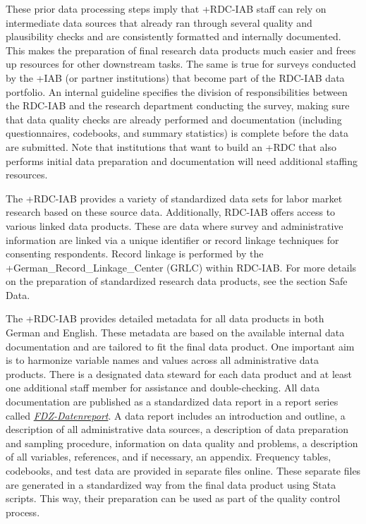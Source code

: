 \documentclass[
]{book}
\begin{document}
These prior data processing steps imply that +RDC-IAB\textbar{} staff can rely on intermediate data sources that already ran through several quality and plausibility checks and are consistently formatted and internally documented. This makes the preparation of final research data products much easier and frees up resources for other downstream tasks. The same is true for surveys conducted by the +IAB\textbar{} (or partner institutions) that become part of the RDC-IAB data portfolio. An internal guideline specifies the division of responsibilities between the RDC-IAB and the research department conducting the survey, making sure that data quality checks are already performed and documentation (including questionnaires, codebooks, and summary statistics) is complete before the data are submitted. Note that institutions that want to build an +RDC\textbar{} that also performs initial data preparation and documentation will need additional staffing resources.

The +RDC-IAB\textbar{} provides a variety of standardized data sets for labor market research based on these source data. Additionally, RDC-IAB offers access to various linked data products. These are data where survey and administrative information are linked via a unique identifier or record linkage techniques for consenting respondents. Record linkage is performed by the +German\_Record\_Linkage\_Center\textbar{} (GRLC) within RDC-IAB. For more details on the preparation of standardized research data products, see the section Safe Data.

The +RDC-IAB\textbar{} provides detailed metadata for all data products in both German and English. These metadata are based on the available internal data documentation and are tailored to fit the final data product. One important aim is to harmonize variable names and values across all administrative data products. There is a designated data steward for each data product and at least one additional staff member for assistance and double-checking. All data documentation are published as a standardized data report in a report series called \href{https://fdz.iab.de/en/FDZ_Publications/FDZ_Publication_Series/FDZ-Datenreporte.aspx}{\emph{FDZ-Datenreport}}. A data report includes an introduction and outline, a description of all administrative data sources, a description of data preparation and sampling procedure, information on data quality and problems, a description of all variables, references, and if necessary, an appendix. Frequency tables, codebooks, and test data are provided in separate files online. These separate files are generated in a standardized way from the final data product using Stata scripts. This way, their preparation can be used as part of the quality control process.
\end{document}

